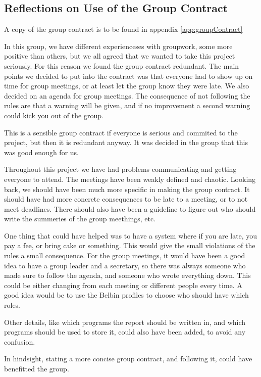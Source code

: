 

\subsection{Reflections on Use of the Group Contract}

A copy of the group contract is to be found in appendix \ref{app:groupContract}

In this group, we have different experienceses with groupwork, some more positive than others, but we all agreed that we wanted to take this project seriously. For this reason we found the group contract redundant. 
The main points we decided to put into the contract was that everyone had to show up on time for group meetings, or at least let the group know they were late. We also decided on an agenda for group meetings. The consequence of not following the rules are that a warning will be given, and if no improvement a second warning could kick you out of the group. 

This is a sensible group contract if everyone is serious and commited to the project, but then it is redundant anyway. It was decided in the group that this was good enough for us. 

Throughout this project we have had problems communicating and getting everyone to attend. The meetings have been weakly defined and chaotic. 
Looking back, we should have been much more specific in making the group contract. It should have had more concrete consequences to be late to a meeting, or to not meet deadlines. There should also have been a guideline to figure out who should write the summeries of the group meethings, etc. 

One thing that could have helped was to have a system where if you are late, you pay a fee, or bring cake or something. This would give the small violations of the rules a small consequence. 
For the group meetings, it would have been a good idea to have a group leader and a secretary, so there was always someone who made sure to follow the agenda, and someone who wrote everything down. This could be either changing from each meeting or different people every time. A good idea would be to use the Belbin profiles to choose who should have which roles. 

Other details, like which programs the report should be written in, and which programs should be used to store it, could also have been added, to avoid any confusion. 

In hindsight, stating a more concise group contract, and following it, could have benefitted the group.